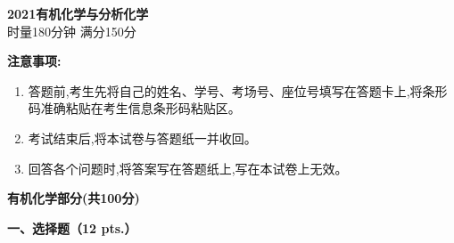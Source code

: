 \begin{center}
    {\LARGE \textbf{2021有机化学与分析化学}} \\[2ex]
    {\large 时量180分钟 \quad 满分150分}
\end{center}

\vspace{0.5cm}
\noindent\textbf{注意事项:}
\begin{enumerate}[label=\arabic*., parsep=0pt, itemsep=0pt]
    \item 答题前,考生先将自己的姓名、学号、考场号、座位号填写在答题卡上,将条形码准确粘贴在考生信息条形码粘贴区。
    \item 考试结束后,将本试卷与答题纸一并收回。
    \item 回答各个问题时,将答案写在答题纸上,写在本试卷上无效。
\end{enumerate}

\vspace{1cm}
\begin{center}
    {\Large \textbf{有机化学部分(共100分)}}
\end{center}

\vspace{0.5cm}
\noindent\textbf{一、选择题（12 pts.）}

